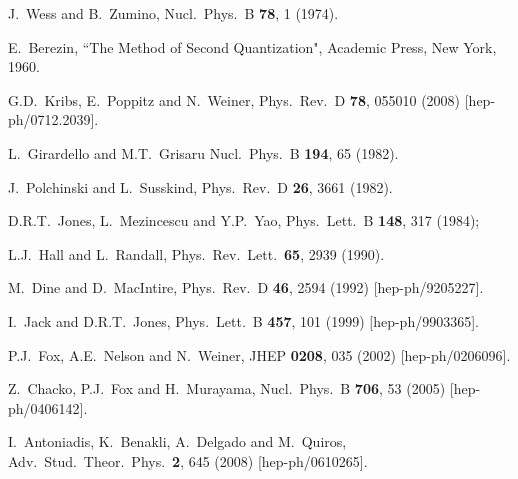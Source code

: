 \documentclass[11pt]{article}
\begin{document}
\begin{thebibliography}{999}
J.~Wess and B.~Zumino,
  Nucl.\ Phys.\ B {\bf 78}, 1 (1974).

 E.~Berezin, ``The Method of Second Quantization", 
Academic Press, New York, 1960.

  G.D.~Kribs, E.~Poppitz and N.~Weiner,
  Phys.\ Rev.\  D {\bf 78}, 055010 (2008)
  [hep-ph/0712.2039].

L.~Girardello and M.T.~Grisaru
  Nucl.\ Phys.\ B {\bf 194}, 65 (1982).

J.~Polchinski and L.~Susskind,
  Phys.\ Rev.\  D {\bf 26}, 3661 (1982).

D.R.T.~Jones, L.~Mezincescu and Y.P.~Yao,
  Phys.\ Lett.\ B {\bf 148}, 317 (1984);

L.J.~Hall and L.~Randall, 
  Phys.\ Rev.\ Lett.\  {\bf 65}, 2939 (1990).

  M.~Dine and D.~MacIntire,
  Phys.\ Rev.\  D {\bf 46}, 2594 (1992)
  [hep-ph/9205227].

I.~Jack and D.R.T.~Jones,
  Phys.\ Lett.\ B {\bf 457}, 101 (1999)
  [hep-ph/9903365].
   
P.J.~Fox, A.E.~Nelson and N.~Weiner,
  JHEP {\bf 0208}, 035 (2002)
  [hep-ph/0206096].

Z.~Chacko, P.J.~Fox and H.~Murayama,
  Nucl.\ Phys.\ B {\bf 706}, 53 (2005)
  [hep-ph/0406142].

  I.~Antoniadis, K.~Benakli, A.~Delgado and M.~Quiros,
  Adv.\ Stud.\ Theor.\ Phys.\ {\bf 2}, 645 (2008)
  [hep-ph/0610265].


\end{thebibliography}
\end{document}
